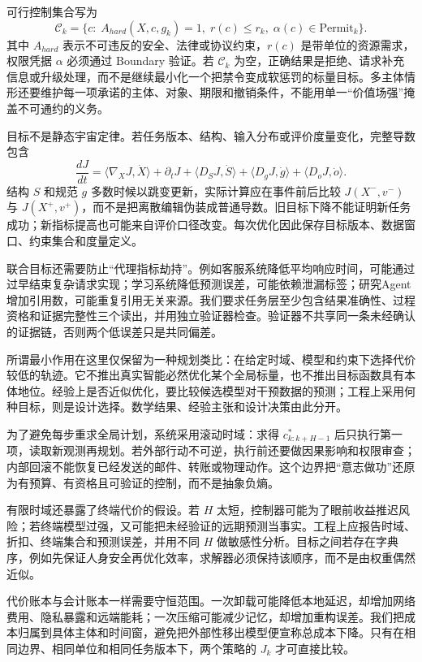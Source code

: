 可行控制集合写为
\begin{equation}
\mathcal C_k=\{c:\;A_{hard}(X,c,g_k)=1,\;r(c)\le r_k,\;\alpha(c)\in\mathrm{Permit}_k\}.
\end{equation}
其中 $A_{hard}$ 表示不可违反的安全、法律或协议约束，$r(c)$ 是带单位的资源需求，权限凭据 $\alpha$ 必须通过 Boundary 验证。若 $\mathcal C_k$ 为空，正确结果是拒绝、请求补充信息或升级处理，而不是继续最小化一个把禁令变成软惩罚的标量目标。多主体情形还要维护每一项承诺的主体、对象、期限和撤销条件，不能用单一“价值场强”掩盖不可通约的义务。

目标不是静态宇宙定律。若任务版本、结构、输入分布或评价度量变化，完整导数包含
\begin{equation}
\frac{dJ}{dt}=\langle\nabla_XJ,\dot X\rangle+\partial_tJ+\langle D_SJ,\dot S\rangle+\langle D_gJ,\dot g\rangle+\langle D_oJ,\dot o\rangle .
\end{equation}
结构 $S$ 和规范 $g$ 多数时候以跳变更新，实际计算应在事件前后比较 $J(X^-,v^-)$ 与 $J(X^+,v^+)$，而不是把离散编辑伪装成普通导数。旧目标下降不能证明新任务成功；新指标提高也可能来自评价口径改变。每次优化因此保存目标版本、数据窗口、约束集合和度量定义。

联合目标还需要防止“代理指标劫持”。例如客服系统降低平均响应时间，可能通过过早结束复杂请求实现；学习系统降低预测误差，可能依赖泄漏标签；研究Agent增加引用数，可能重复引用无关来源。我们要求任务层至少包含结果准确性、过程资格和证据完整性三个读出，并用独立验证器检查。验证器不共享同一条未经确认的证据链，否则两个低误差只是共同偏差。

所谓最小作用在这里仅保留为一种规划类比：在给定时域、模型和约束下选择代价较低的轨迹。它不推出真实智能必然优化某个全局标量，也不推出目标函数具有本体地位。经验上是否近似优化，要比较候选模型对干预数据的预测；工程上采用何种目标，则是设计选择。数学结果、经验主张和设计决策由此分开。

为了避免每步重求全局计划，系统采用滚动时域：求得 $c^*_{k:k+H-1}$ 后只执行第一项，读取新观测再规划。若外部行动不可逆，执行前还要做因果影响和权限审查；内部回滚不能恢复已经发送的邮件、转账或物理动作。这个边界把“意志做功”还原为有预算、有资格且可验证的控制，而不是抽象负熵。

有限时域还暴露了终端代价的假设。若 $H$ 太短，控制器可能为了眼前收益推迟风险；若终端模型过强，又可能把未经验证的远期预测当事实。工程上应报告时域、折扣、终端集合和预测误差，并用不同 $H$ 做敏感性分析。目标之间若存在字典序，例如先保证人身安全再优化效率，求解器必须保持该顺序，而不是由权重偶然近似。

代价账本与会计账本一样需要守恒范围。一次卸载可能降低本地延迟，却增加网络费用、隐私暴露和远端能耗；一次压缩可能减少记忆，却增加重构误差。我们把成本归属到具体主体和时间窗，避免把外部性移出模型便宣称总成本下降。只有在相同边界、相同单位和相同任务版本下，两个策略的 $J_k$ 才可直接比较。


